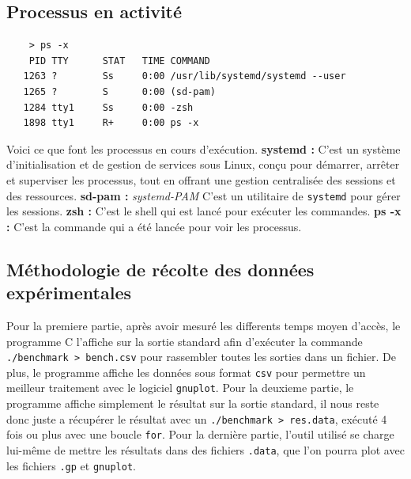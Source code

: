 \documentclass{rapport}
\begin{document}
    \subsection*{Processus en activité}
    \begin{verbatim}
    > ps -x
    PID TTY      STAT   TIME COMMAND
   1263 ?        Ss     0:00 /usr/lib/systemd/systemd --user
   1265 ?        S      0:00 (sd-pam)
   1284 tty1     Ss     0:00 -zsh
   1898 tty1     R+     0:00 ps -x
    \end{verbatim}
    Voici ce que font les processus en cours d'exécution.
    \newline\newline
    \textbf{systemd :} C'est un système d'initialisation et de gestion de services sous Linux, conçu pour démarrer, arrêter et superviser les processus, tout en offrant une gestion centralisée des sessions et des ressources.
    \newline
    \textbf{sd-pam :} \textit{systemd-PAM} C'est un utilitaire de \texttt{systemd} pour gérer les sessions.
    \newline
    \textbf{zsh :} C'est le shell qui est lancé pour exécuter les commandes.
    \newline
    \textbf{ps -x :} C'est la commande qui a été lancée pour voir les processus.
    
    \subsection*{Méthodologie de récolte des données expérimentales}
    Pour la premiere partie, après avoir mesuré les differents temps moyen d'accès, le programme C l'affiche sur la sortie standard afin d'exécuter la commande \texttt{./benchmark > bench.csv} pour rassembler toutes les sorties dans un fichier. De plus, le programme affiche les données sous format \texttt{csv} pour permettre un meilleur traitement avec le logiciel \texttt{gnuplot}.\newline
    Pour la deuxieme partie, le programme affiche simplement le résultat sur la sortie standard, il nous reste donc juste a récupérer le résultat avec un \texttt{./benchmark > res.data}, exécuté 4 fois ou plus avec une boucle \texttt{for}.\newline
    Pour la dernière partie, l'outil utilisé se charge lui-même de mettre les résultats dans des fichiers \texttt{.data}, que l'on pourra plot avec les fichiers \texttt{.gp} et \texttt{gnuplot}.

    \clearpage
    
\end{document}
